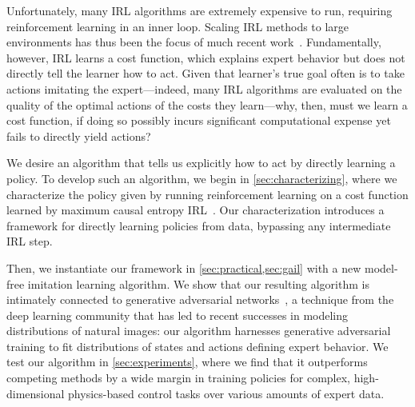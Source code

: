 \documentclass{article}
\newcommand{\1}{\mathbb{I}} %
\newcommand{\stefano}[1]{{\color{green} [SE: {#1}]}}
\begin{document}
Unfortunately, many IRL algorithms are extremely expensive to run, requiring reinforcement learning in an inner loop. Scaling IRL methods to large environments has thus been the focus of much recent work~\cite{finn2016guided,levine2012continuous}.
Fundamentally, however, IRL learns a cost function, which explains expert behavior but does not directly tell the learner how to act.
Given that learner's true goal often is to take actions imitating the expert---indeed, many IRL algorithms are evaluated on the quality of the optimal actions of the costs they learn---why, then, must we learn a cost function, if doing so possibly incurs significant computational expense yet fails to directly yield actions?%

We desire an algorithm that tells us explicitly how to act by directly learning a policy.
To develop such an algorithm, we begin in \cref{sec:characterizing}, where we characterize the policy given by running reinforcement learning on a cost function learned by maximum causal entropy IRL~\citep{ziebart2008maximum,ziebart2010modeling}.
Our characterization introduces a framework for directly learning policies from data, bypassing any intermediate IRL step.




Then, we instantiate our framework in \cref{sec:practical,sec:gail} with a new model-free imitation learning algorithm.
We show that our resulting algorithm is intimately connected to generative adversarial networks~\citep{goodfellow2014generative}, a technique from the deep learning community that has led to recent successes in modeling distributions of natural images: our algorithm harnesses generative adversarial training to fit distributions of states and actions defining expert behavior.
We test our algorithm in \cref{sec:experiments}, where we find that it outperforms competing methods by a wide margin in training policies for complex, high-dimensional physics-based control tasks over various amounts of expert data.
\end{document}
